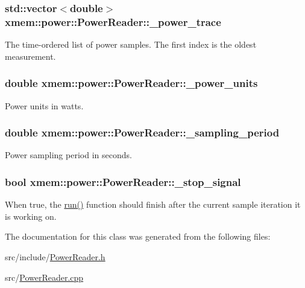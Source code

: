 \subsubsection[{\+\_\+power\+\_\+trace}]{\setlength{\rightskip}{0pt plus 5cm}std\+::vector$<$double$>$ xmem\+::power\+::\+Power\+Reader\+::\+\_\+power\+\_\+trace\hspace{0.3cm}{\ttfamily [protected]}}\label{classxmem_1_1power_1_1_power_reader_ac8ad4bada42912ece1cbb0769dbe3b4d}
The time-\/ordered list of power samples. The first index is the oldest measurement. \hypertarget{classxmem_1_1power_1_1_power_reader_a2835c933bd4807d6b3133a521dd76641}{}
\subsubsection[{\+\_\+power\+\_\+units}]{\setlength{\rightskip}{0pt plus 5cm}double xmem\+::power\+::\+Power\+Reader\+::\+\_\+power\+\_\+units\hspace{0.3cm}{\ttfamily [protected]}}\label{classxmem_1_1power_1_1_power_reader_a2835c933bd4807d6b3133a521dd76641}
Power units in watts. \hypertarget{classxmem_1_1power_1_1_power_reader_a1c7d9b505d3c94347c43437a568e5948}{}
\subsubsection[{\+\_\+sampling\+\_\+period}]{\setlength{\rightskip}{0pt plus 5cm}double xmem\+::power\+::\+Power\+Reader\+::\+\_\+sampling\+\_\+period\hspace{0.3cm}{\ttfamily [protected]}}\label{classxmem_1_1power_1_1_power_reader_a1c7d9b505d3c94347c43437a568e5948}
Power sampling period in seconds. \hypertarget{classxmem_1_1power_1_1_power_reader_a1c0c890279f3f2b7eb41ab3e5889bf2e}{}
\subsubsection[{\+\_\+stop\+\_\+signal}]{\setlength{\rightskip}{0pt plus 5cm}bool xmem\+::power\+::\+Power\+Reader\+::\+\_\+stop\+\_\+signal\hspace{0.3cm}{\ttfamily [protected]}}\label{classxmem_1_1power_1_1_power_reader_a1c0c890279f3f2b7eb41ab3e5889bf2e}
When true, the \hyperlink{classxmem_1_1power_1_1_power_reader_ad8286b3727efbcb0ff5049c6594d126a}{run()} function should finish after the current sample iteration it is working on. 

The documentation for this class was generated from the following files\+:\begin{DoxyCompactItemize}
\item 
src/include/\hyperlink{_power_reader_8h}{Power\+Reader.\+h}\item 
src/\hyperlink{_power_reader_8cpp}{Power\+Reader.\+cpp}\end{DoxyCompactItemize}
